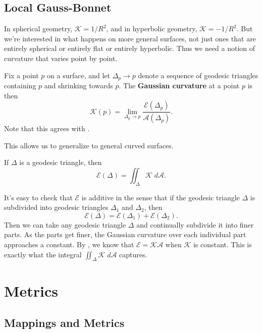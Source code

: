 \documentclass[twoside,10pt]{report}
\begin{document}
\section{Local Gauss-Bonnet}

In spherical geometry, $\mathcal{K} = 1/R^2$, and in hyperbolic geometry, $\mathcal{K} = -1/R^2$. But we're interested in what happens on more general surfaces, not just ones that are entirely spherical or entirely flat or entirely hyperbolic. Thus we need a notion of curvature that varies point by point.

\begin{defn}[]
	Fix a point $p$ on a surface, and let $\Delta_{p}\to p$ denote a sequence of geodesic triangles containing $p$ and shrinking towards $p$. The \textbf{Gaussian curvature} at a point $p$ is then
	\[
	\mathcal{K}(p) = \lim_{\Delta_{p} \to p} \frac{\mathcal{E}(\Delta_{p})}{\mathcal{A}(\Delta_{p})} .
	\] 
	Note that this agrees with .
\end{defn}
This allows us to generalize  to general curved surfaces.
\begin{thrm}
	\label{GB-local}
	If $\Delta$ is a geodesic triangle, then
	\[
	\mathcal{E}(\Delta) = \iint_{\Delta} \mathcal{K}\;d\mathcal{A}.
	\] 
\end{thrm}
It's easy to check that $\mathcal{E}$ is additive in the sense that if the geodesic triangle $\Delta$ is subdivided into geodesic triangles $\Delta_1 $ and $\Delta_2$, then
\[
\mathcal{E}(\Delta) = \mathcal{E}(\Delta_1) + \mathcal{E}(\Delta_2).
\] 
Then we can take any geodesic triangle $\Delta$ and continually subdivide it into finer parts. As the parts get finer, the Gaussian curvature over each individual part approaches a constant. By , we know that $\mathcal{E} = \mathcal{K} \mathcal{A}$ when $\mathcal{K}$ is constant. This is exactly what the integral $\iint_{\Delta} \mathcal{K}\;d\mathcal{A}$ captures.


\chapter{Metrics}

\section{Mappings and Metrics}
\end{document}
